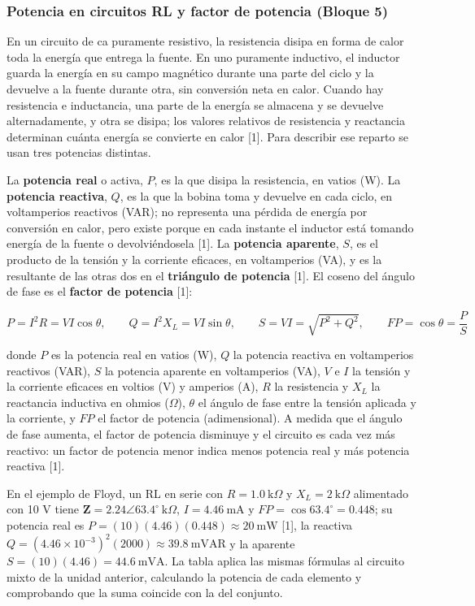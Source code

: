 \documentclass[11pt,letterpaper]{article}
\begin{document}
\subsubsection{Potencia en circuitos RL y factor de potencia (Bloque 5)}

En un circuito de ca puramente resistivo, la resistencia disipa en forma de calor toda la energía que entrega la fuente. En uno puramente inductivo, el inductor guarda la energía en su campo magnético durante una parte del ciclo y la devuelve a la fuente durante otra, sin conversión neta en calor. Cuando hay resistencia e inductancia, una parte de la energía se almacena y se devuelve alternadamente, y otra se disipa; los valores relativos de resistencia y reactancia determinan cuánta energía se convierte en calor [1]. Para describir ese reparto se usan tres potencias distintas.

La \textbf{potencia real} o activa, $P$, es la que disipa la resistencia, en vatios (W). La \textbf{potencia reactiva}, $Q$, es la que la bobina toma y devuelve en cada ciclo, en voltamperios reactivos (VAR); no representa una pérdida de energía por conversión en calor, pero existe porque en cada instante el inductor está tomando energía de la fuente o devolviéndosela [1]. La \textbf{potencia aparente}, $S$, es el producto de la tensión y la corriente eficaces, en voltamperios (VA), y es la resultante de las otras dos en el \textbf{triángulo de potencia} [1]. El coseno del ángulo de fase es el \textbf{factor de potencia} [1]:

\begin{equation}
  P = I^{2}R = VI\cos\theta, \qquad Q = I^{2}X_L = VI\sin\theta, \qquad S = VI = \sqrt{P^{2} + Q^{2}}, \qquad FP = \cos\theta = \frac{P}{S}
\end{equation}

donde $P$ es la potencia real en vatios (W), $Q$ la potencia reactiva en voltamperios reactivos (VAR), $S$ la potencia aparente en voltamperios (VA), $V$ e $I$ la tensión y la corriente eficaces en voltios (V) y amperios (A), $R$ la resistencia y $X_L$ la reactancia inductiva en ohmios (\ensuremath{\Omega}), $\theta$ el ángulo de fase entre la tensión aplicada y la corriente, y $FP$ el factor de potencia (adimensional). A medida que el ángulo de fase aumenta, el factor de potencia disminuye y el circuito es cada vez más reactivo: un factor de potencia menor indica menos potencia real y más potencia reactiva [1].

En el ejemplo de Floyd, un RL en serie con $R = 1.0\ \text{k}\Omega$ y $X_L = 2\ \text{k}\Omega$ alimentado con 10 V tiene $\mathbf{Z} = 2.24 \angle 63.4^\circ\ \text{k}\Omega$, $I = 4.46\ \text{mA}$ y $FP = \cos 63.4^\circ = 0.448$; su potencia real es $P = (10)(4.46)(0.448) \approx 20\ \text{mW}$ [1], la reactiva $Q = (4.46 \times 10^{-3})^2(2000) \approx 39.8\ \text{mVAR}$ y la aparente $S = (10)(4.46) = 44.6\ \text{mVA}$. La tabla aplica las mismas fórmulas al circuito mixto de la unidad anterior, calculando la potencia de cada elemento y comprobando que la suma coincide con la del conjunto.
\end{document}
